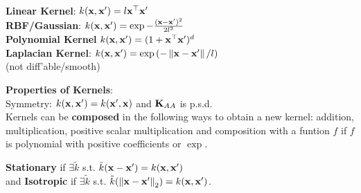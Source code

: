 \begin{framed}
    \textbf{Linear Kernel}: $k(\mathbf{x}, \mathbf{x'}) = l \mathbf{x}^\top \mathbf{x'}$ \\
    \textbf{RBF/Gaussian}: $k(\mathbf{x}, \mathbf{x'}) = \exp{-\frac{(\mathbf{x}- \mathbf{x'})^2}{2 l^2}}$ \\
    \textbf{Polynomial Kernel} $k(\mathbf{x}, \mathbf{x'}) = (1 + \mathbf{x}^\top \mathbf{x'})^d$ \\
    \textbf{Laplacian Kernel}: $k(\vx, \vxp) = \exp{\left(- \norm{\vx - \vxp}/l\right)}$ \\
    (not diff'able/smooth)
\end{framed}
\begin{framed}
    \textbf{Properties of Kernels}:  \\
    Symmetry: $k(\mathbf{x}, \mathbf{x'}) = k(\mathbf{x'}, \mathbf{x})$ and $\mathbf{K}_{AA}$ is p.s.d. \\
    Kernels can be \textbf{composed} in the following ways to obtain a new kernel: addition, multiplication, positive scalar multiplication and composition with a funtion $f$ if $f$ is polynomial with positive coefficients or $\exp$.
\end{framed}
\textbf{Stationary} if $\exists\tilde{k}$ s.t. $\tilde{k}(\mathbf{x} - \mathbf{x'}) = k(\mathbf{x}, \mathbf{x'})$ \\
and \textbf{Isotropic} if $\exists\tilde{k}$ s.t. $\tilde{k}(\norm{\vx-\vxp}_2) = k(\vx, \vxp)$.
\vspace*{\fill}
